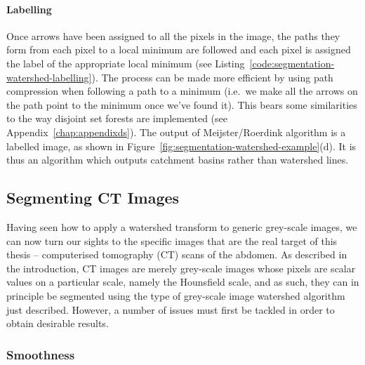 \paragraph{Labelling}

Once arrows have been assigned to all the pixels in the image, the paths they form from each pixel to a local minimum are followed and each pixel is assigned the label of the appropriate local minimum (see Listing~\ref{code:segmentation-watershed-labelling}). The process can be made more efficient by using path compression when following a path to a minimum (i.e.~we make all the arrows on the path point to the minimum once we've found it). This bears some similarities to the way disjoint set forests are implemented (see Appendix~\ref{chap:appendixds}). The output of Meijster/Roerdink algorithm is a labelled image, as shown in Figure~\ref{fig:segmentation-watershed-example}(d). It is thus an algorithm which outputs catchment basins rather than watershed lines.

\subsection{Segmenting CT Images}
\label{subsec:segmentation-watershed-ct}

Having seen how to apply a watershed transform to generic grey-scale images, we can now turn our sights to the specific images that are the real target of this thesis -- computerised tomography (CT) scans of the abdomen. As described in the introduction, CT images are merely grey-scale images whose pixels are scalar values on a particular scale, namely the Hounsfield scale, and as such, they can in principle be segmented using the type of grey-scale image watershed algorithm just described. However, a number of issues must first be tackled in order to obtain desirable results.

\subsubsection{Smoothness}
\label{subsubsec:segmentation-watershed-ct-smoothness}


